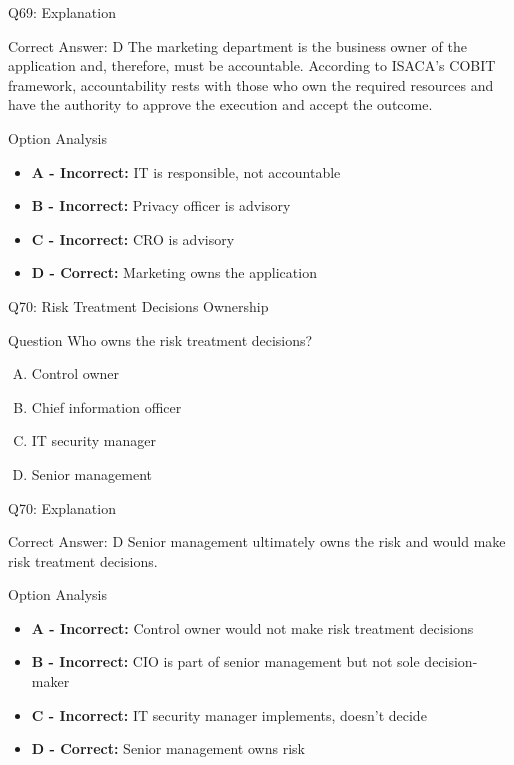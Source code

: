 \documentclass{beamer}
\begin{document}
	\begin{frame}{Q69: Explanation}
		\begin{block}{Correct Answer: D}
			The marketing department is the business owner of the application and, therefore, must be accountable. According to ISACA's COBIT framework, accountability rests with those who own the required resources and have the authority to approve the execution and accept the outcome.
		\end{block}
		\begin{block}{Option Analysis}
			\begin{itemize}
				\item \textbf{A - Incorrect:} IT is responsible, not accountable
				\item \textbf{B - Incorrect:} Privacy officer is advisory
				\item \textbf{C - Incorrect:} CRO is advisory
				\item \textbf{D - Correct:} Marketing owns the application
			\end{itemize}
		\end{block}
	\end{frame}
	
	\begin{frame}{Q70: Risk Treatment Decisions Ownership}
		\begin{block}{Question}
			Who owns the risk treatment decisions?
		\end{block}
		\begin{enumerate}[(A)]
			\item Control owner
			\item Chief information officer
			\item IT security manager
			\item Senior management
		\end{enumerate}
	\end{frame}
	
	\begin{frame}{Q70: Explanation}
		\begin{block}{Correct Answer: D}
			Senior management ultimately owns the risk and would make risk treatment decisions.
		\end{block}
		\begin{block}{Option Analysis}
			\begin{itemize}
				\item \textbf{A - Incorrect:} Control owner would not make risk treatment decisions
				\item \textbf{B - Incorrect:} CIO is part of senior management but not sole decision-maker
				\item \textbf{C - Incorrect:} IT security manager implements, doesn't decide
				\item \textbf{D - Correct:} Senior management owns risk
			\end{itemize}
		\end{block}
	\end{frame}
	
\end{document}
